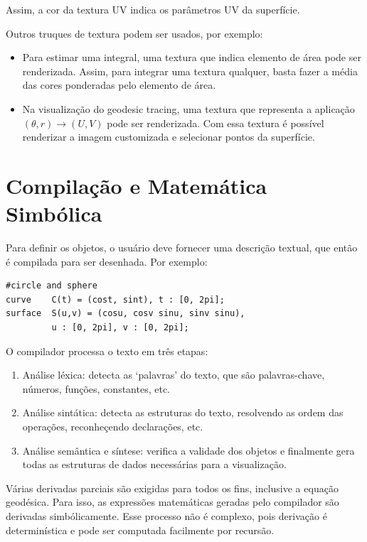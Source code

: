 \documentclass[10pt,a4paper]{article}
\begin{document}
Assim, a cor da textura UV indica os parâmetros UV da superfície.

Outros truques de textura podem ser usados, por exemplo:

\begin{itemize}
\item Para estimar uma integral, uma textura que indica elemento de área pode ser renderizada.
Assim, para integrar uma textura qualquer, basta fazer a média das cores ponderadas pelo elemento de área.

\item Na visualização do geodesic tracing, uma textura que representa
a aplicação $(\theta, r) \rightarrow (U, V)$ pode ser renderizada.
Com essa textura é possível renderizar a imagem customizada e selecionar pontos da superfície.
\end{itemize}

\newpage
\section*{Compilação e Matemática Simbólica}

Para definir os objetos, o usuário deve fornecer uma descrição textual, que então é compilada para ser desenhada.
Por exemplo:

\begin{lstlisting}[frame=single, caption=Descrição textual]
#circle and sphere
curve	 C(t) = (cost, sint), t : [0, 2pi];
surface	 S(u,v) = (cosu, cosv sinu, sinv sinu),
	     u : [0, 2pi], v : [0, 2pi];
\end{lstlisting}

O compilador processa o texto em três etapas:

\begin{enumerate}
\item Análise léxica: detecta as `palavras' do texto, que são palavras-chave, números, funções, constantes, etc.

\item Análise sintática: detecta as estruturas do texto, resolvendo as ordem das operações, reconheçendo declarações, etc.

\item Análise semântica e síntese: verifica a validade dos objetos
e finalmente gera todas as estruturas de dados necessárias para a visualização.
\end{enumerate}

Várias derivadas parciais são exigidas para todos os fins, inclusive a equação geodésica.
Para isso, as expressões matemáticas geradas pelo compilador são derivadas simbólicamente.
Esse processo não é complexo, pois derivação é determinística e pode ser computada facilmente por recursão.
\end{document}
